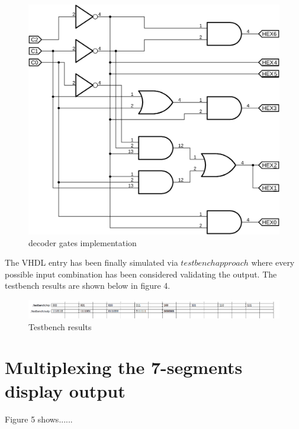 \documentclass[12pt]{article}
\begin{document}
	 
	 
	  \begin{figure}[!h]
	  \centering
	  \includegraphics[scale = 0.65]{Niki_puntoA/schema.png}
	  \caption{decoder gates implementation}
  	\end{figure}		
  
  The VHDL entry has been finally simulated via  $testbench approach$ where every possible input combination has been considered validating the output.
  The testbench results are shown below in figure 4.
  
  \begin{figure}[!h]
  	\centering
  	\includegraphics[scale = 0.65]{Niki_puntoA/Capturef.png}
  	\caption{Testbench results}
  \end{figure}





\section{ Multiplexing the 7-segments display output}

	Figure 5 shows...... 
\end{document}
